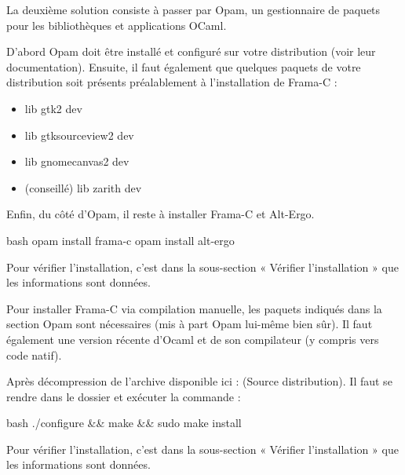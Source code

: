 \documentclass[middle]{zmdocument}
\begin{document}
La deuxième solution consiste à passer par Opam, un gestionnaire de paquets 
pour les bibliothèques et applications OCaml.



D'abord Opam doit être installé et configuré sur votre distribution (voir 
leur documentation). Ensuite, il faut également que quelques paquets de votre
distribution soit présents préalablement à l'installation de Frama-C :



\begin{itemize}
\item lib gtk2 dev
\item lib gtksourceview2 dev
\item lib gnomecanvas2 dev
\item (conseillé) lib zarith dev
\end{itemize}


Enfin, du côté d'Opam, il reste à installer Frama-C et Alt-Ergo.



\begin{CodeBlock}{bash}
opam install frama-c
opam install alt-ergo
\end{CodeBlock}



Pour vérifier l'installation, c'est dans la sous-section « Vérifier l'installation »
que les informations sont données.





Pour installer Frama-C via compilation manuelle, les paquets indiqués dans la 
section Opam sont nécessaires (mis à part Opam lui-même bien sûr). Il faut
également une version récente d'Ocaml et de son compilateur (y compris vers 
code natif).



Après décompression de l'archive disponible ici : 
 (Source distribution). 
Il faut se rendre dans le dossier et exécuter la commande :



\begin{CodeBlock}{bash}
./configure && make && sudo make install
\end{CodeBlock}



Pour vérifier l'installation, c'est dans la sous-section « Vérifier l'installation »
que les informations sont données.
\end{document}
